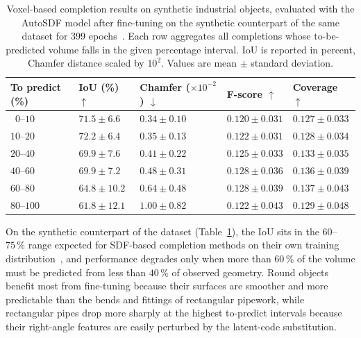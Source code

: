 \begin{table}[h]
    \centering
    \caption[Voxel-based completion on industrial objects]{Voxel-based completion results on synthetic industrial objects, evaluated with the AutoSDF model after fine-tuning on the synthetic counterpart of the same dataset for 399 epochs~\cite{decrocq_voxel_2025}. Each row aggregates all completions whose to-be-predicted volume falls in the given percentage interval. IoU is reported in percent, Chamfer distance scaled by $10^2$. Values are mean $\pm$ standard deviation.}
    \label{tab:7_industrial}
    \begin{tabularx}{\textwidth}{l >{\centering\arraybackslash}X >{\centering\arraybackslash}X >{\centering\arraybackslash}X >{\centering\arraybackslash}X}
        \toprule
        \textbf{To predict (\%)} & \textbf{IoU (\%) $\uparrow$} & \textbf{Chamfer ($\times 10^{-2}$) $\downarrow$} & \textbf{F-score $\uparrow$} & \textbf{Coverage $\uparrow$} \\
        \midrule
        $\phantom{0}0$--$10$  & $71.5 \pm 6.6$  & $0.34 \pm 0.10$ & $0.120 \pm 0.031$ & $0.127 \pm 0.033$ \\
        $10$--$20$            & $72.2 \pm 6.4$  & $0.35 \pm 0.13$ & $0.122 \pm 0.031$ & $0.128 \pm 0.034$ \\
        $20$--$40$            & $69.9 \pm 7.6$  & $0.41 \pm 0.22$ & $0.125 \pm 0.033$ & $0.133 \pm 0.035$ \\
        $40$--$60$            & $69.9 \pm 7.2$  & $0.48 \pm 0.31$ & $0.128 \pm 0.036$ & $0.136 \pm 0.039$ \\
        $60$--$80$            & $64.8 \pm 10.2$ & $0.64 \pm 0.48$ & $0.128 \pm 0.039$ & $0.137 \pm 0.043$ \\
        $80$--$100$           & $61.8 \pm 12.1$ & $1.00 \pm 0.82$ & $0.122 \pm 0.043$ & $0.129 \pm 0.048$ \\
        \bottomrule
    \end{tabularx}
\end{table}
 
On the synthetic counterpart of the dataset (Table~\ref{tab:7_industrial}), the IoU sits in the $60$--$75\,\%$ range expected for SDF-based completion methods on their own training distribution~\cite{rao_patchcomplete_2022, chu_diffcomplete_2023}, and performance degrades only when more than $60\,\%$ of the volume must be predicted from less than $40\,\%$ of observed geometry. Round objects benefit most from fine-tuning because their surfaces are smoother and more predictable than the bends and fittings of rectangular pipework, while rectangular pipes drop more sharply at the highest to-predict intervals because their right-angle features are easily perturbed by the latent-code substitution.
 

